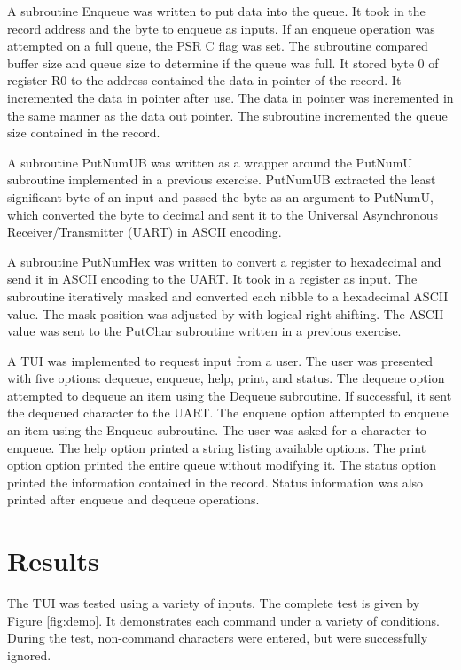 \documentclass[CMPE]{KGCOEReport}
\begin{document}
A subroutine Enqueue was written to put data into the queue. It took in the
record address and the byte to enqueue as inputs. If an enqueue operation was
attempted on a full queue, the PSR C flag was set. The subroutine compared
buffer size and queue size to determine if the queue was full. It stored byte
0 of register R0 to the address contained the data in pointer of the record. It
incremented the data in pointer after use. The data in pointer was incremented
in the same manner as the data out pointer. The subroutine incremented the
queue size contained in the record.

A subroutine PutNumUB was written as a wrapper around the PutNumU subroutine
implemented in a previous exercise. PutNumUB extracted the least significant
byte of an input and passed the byte as an argument to PutNumU, which converted
the byte to decimal and sent it to the Universal Asynchronous
Receiver/Transmitter (UART) in ASCII encoding.

A subroutine PutNumHex was written to convert a register to hexadecimal and
send it in ASCII encoding to the UART. It took in a register as input. The
subroutine iteratively masked and converted each nibble to a hexadecimal ASCII
value. The mask position was adjusted by with logical right shifting. The ASCII
value was sent to the PutChar subroutine written in a previous exercise.

A TUI was implemented to request input from a user. The user was presented with
five options: dequeue, enqueue, help, print, and status. The dequeue option
attempted to dequeue an item using the Dequeue subroutine. If successful, it
sent the dequeued character to the UART. The enqueue option attempted to
enqueue an item using the Enqueue subroutine. The user was asked for a
character to enqueue. The help option printed a string listing available
options. The print option option printed the entire queue without modifying it.
The status option printed the information contained in the record. Status
information was also printed after enqueue and dequeue operations.

\section*{Results}

The TUI was tested using a variety of inputs. The complete test is given by
Figure \ref{fig:demo}. It demonstrates each command under a variety of
conditions. During the test, non-command characters were entered, but were
successfully ignored.
\end{document}
